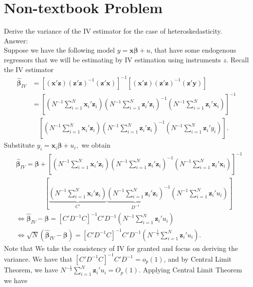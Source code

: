 \documentclass[10pt]{article}
\begin{document}
\section*{Non-textbook Problem}
Derive the variance of the IV estimator for the case of heteroskedasticity.
\\ Answer:\\
Suppose we have the following model $y=\textbf{x}\pmb{\beta}+u$, that have some endogenous regressors that we will be estimating by IV estimation using instruments $z$. Recall the IV estimator
\begin{align*}
    \hat{\pmb{\beta}}_{IV}&=[(\textbf{x}'\textbf{z})(\textbf{z}'\textbf{z})^{-1}(\textbf{z}'\textbf{x})]^{-1}[(\textbf{x}'\textbf{z})(\textbf{z}'\textbf{z})^{-1}(\textbf{z}'\textbf{y})]\\
    &=\left[\left(N^{-1}\sum_{i=1}^N\textbf{x}_i'\textbf{z}_i\right)\left(N^{-1}\sum_{i=1}^N\textbf{z}_i'\textbf{z}_i\right)^{-1}\left(N^{-1}\sum_{i=1}^N\textbf{z}_i'\textbf{x}_i\right)\right]^{-1}\\
    &\hspace{12pt}  \left[\left(N^{-1}\sum_{i=1}^N\textbf{x}_i'\textbf{z}_i\right)\left(N^{-1}\sum_{i=1}^N\textbf{z}_i'\textbf{z}_i\right)^{-1}\left(N^{-1}\sum_{i=1}^N\textbf{z}_i'y_i\right)\right].
\end{align*}
Substitute $y_i=\textbf{x}_i\pmb{\beta}+u_i,$ we obtain
\begin{align*}
    &\hat{\pmb{\beta}}_{IV}=\pmb{\beta}+\left[\left(N^{-1}\sum_{i=1}^N\textbf{x}_i'\textbf{z}_i\right)\left(N^{-1}\sum_{i=1}^N\textbf{z}_i'\textbf{z}_i\right)^{-1}\left(N^{-1}\sum_{i=1}^N\textbf{z}_i'\textbf{x}_i\right)\right]^{-1}\\
    & \hspace{50pt}  \left[\underbrace{\left(N^{-1}\sum_{i=1}^N\textbf{x}_i'\textbf{z}_i\right)}_{\displaystyle C'}{\underbrace{\left(N^{-1}\sum_{i=1}^N\textbf{z}_i'\textbf{z}_i\right)}_{\displaystyle D^{-1}}}^{-1}\left(N^{-1}\sum_{i=1}^N\textbf{z}_i'u_i\right)\right]\\
    &\Leftrightarrow\hat{\pmb{\beta}}_{IV}-\pmb{\beta}=[C'D^{-1}C]^{-1}C'D^{-1}\left(N^{-1}\sum_{i=1}^N\textbf{z}_i'u_i\right)\\
    &\Leftrightarrow\sqrt{N}(\hat{\pmb{\beta}}_{IV}-\pmb{\beta})=[C'D^{-1}C]^{-1}C'D^{-1}\left(N^{-\frac{1}{2}}\sum_{i=1}^N\textbf{z}_i'u_i\right).
\end{align*}
Note that We take the consistency of IV for granted and focus on deriving the variance. We have that $[C'D^{-1}C]^{-1}C'D^{-1}=o_p(1)$, and by Central Limit Theorem, we have $N^{-\frac{1}{2}}\sum_{i=1}^N\textbf{z}_i'u_i=O_p(1).$ Applying Central Limit Theorem we have
\end{document}
